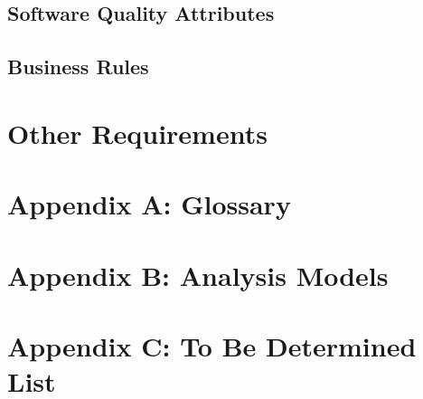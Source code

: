 \documentclass[letterpaper,12pt]{article}
\begin{document}
\subsection{\Large Software Quality Attributes}
\subsection{\Large Business Rules}

\section{\LARGE Other Requirements}

\section*{\LARGE Appendix A: Glossary}
\section*{\LARGE Appendix B: Analysis Models}
\section*{\LARGE Appendix C: To Be Determined List}
\end{document}
